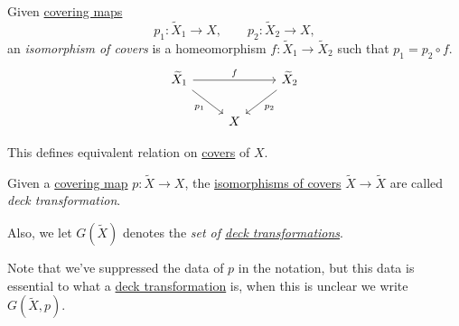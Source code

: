 \begin{definition}\label{def:isomorphism-of-covers}
	Given \hyperref[def:covering-map]{covering maps}
	\[
		p_1\colon \widetilde{X} _1\to X,\qquad p_2\colon \widetilde{X} _2\to X,
	\]
	an \emph{isomorphism of covers} is a homeomorphism \(f\colon \widetilde{X} _1\to \widetilde{X} _2\) such that \(p_1 = p_2\circ f\).
	\[
		\begin{tikzcd}
			{\widetilde{X}_1} && {\widetilde{X}_2} \\
			& X
			\arrow["{p_1}"', from=1-1, to=2-2]
			\arrow["{p_2}", from=1-3, to=2-2]
			\arrow["f", from=1-1, to=1-3]
		\end{tikzcd}
	\]
\end{definition}

\begin{exercise}
	This defines equivalent relation on \hyperref[def:isomorphism-of-covers]{covers} of \(X\).
\end{exercise}

\begin{definition}\label{def:deck-transformation}
	Given a \hyperref[def:covering-map]{covering map} \(p\colon \widetilde{X} \to X\), the  \hyperref[def:isomorphism-of-covers]{isomorphisms of covers}
	\(\widetilde{X} \to \widetilde{X} \) are called \emph{deck transformation}.

	\begin{definition}\label{def:set-of-deck-transformation}
		Also, we let \(G(\widetilde{X} )\) denotes the \emph{set of \hyperref[def:deck-transformation]{deck transformations}}.
	\end{definition}
\end{definition}

\begin{note}
	Note that we've suppressed the data of \(p\) in the notation, but this data is essential to what a \hyperref[def:deck-transformation]{deck transformation}
	is, when this is unclear we write \(G(\widetilde{X} , p)\).
\end{note}